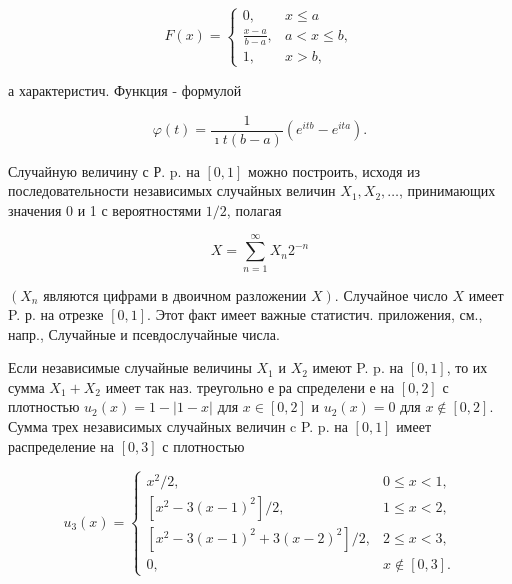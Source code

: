 \documentclass[10pt]{article}
\begin{document}
\[

F(x)=\left\{\begin{array}{cl}

0, & x \leqslant a \\

\frac{x-a}{b-a}, & a<x \leqslant b, \\

1, & x>b,

\end{array}\right.

\]



а характеристич. Функция - формулой



\[

\varphi(t)=\frac{1}{\imath t(b-a)}\left(e^{i t b}-e^{i t a}\right) .

\]



Случайную величину с Р. p. на $[0,1]$ можно построить, исходя из последовательности независимых случайных величин $X_{1}, X_{2}, \ldots$, принимающих значения 0 и 1 с вероятностями $1 / 2$, полагая



\[

X=\sum_{n=1}^{\infty} X_{n} 2^{-n}

\]



$\left(X_{n}\right.$ являются цифрами в двоичном разложении $\left.X\right)$. Случайное число $X$ имеет P. р. на отрезке $[0,1]$. Этот факт имеет важные статистич. приложения, см., напр., Случайные и псевдослучайные числа.



Если независимые случайные величины $X_{1}$ и $X_{2}$ имеют P. p. на $[0,1]$, то их сумма $X_{1}+X_{2}$ имеет так наз. треугольно е ра спределени е на $[0,2]$ с плотностью $u_{2}(x)=1-|1-x|$ для $x \in[0,2]$ и $u_{2}(x)=0$ для $x \notin[0,2]$. Сумма трех независимых случайных величин c P. p. на $[0,1]$ имеет распределение на $[0,3]$ с плотностью



\[

u_{3}(x)= \begin{cases}x^{2} / 2, & 0 \leqslant x<1, \\ {\left[x^{2}-3(x-1)^{2}\right] / 2,} & 1 \leqslant x<2, \\ {\left[x^{2}-3(x-1)^{2}+3(x-2)^{2}\right] / 2,} & 2 \leqslant x<3, \\ 0, & x \notin[0,3] .\end{cases}

\]
\end{document}
